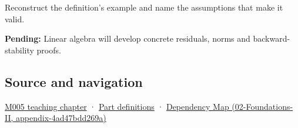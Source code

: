 Reconstruct the definition's example and name the assumptions that make it valid.

\textbf{Pending:} Linear algebra will develop concrete residuals, norms and backward-stability proofs.

\subsection{Source and navigation}\label{source-and-navigation}

\href{Continuous\%20Notes/Computing\%20Foundations\%20-\%20From\%20Bits\%20to\%20C++\%20and\%20Systems\%20APIs\#When\%20arithmetic\%20meets\%20uncertainty}{M005 teaching chapter} · \hyperref[appendix-fd090d982a15]{Part definitions} · \href{}{Dependency Map (02-Foundations-II, appendix-4ad47bdd269a)}
